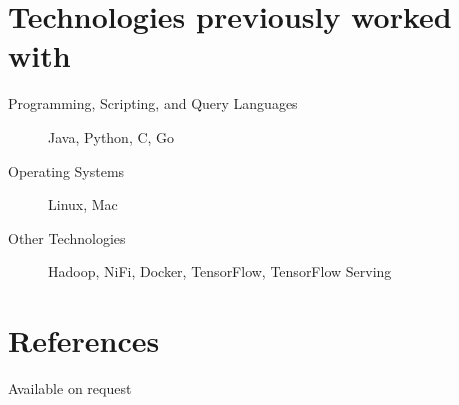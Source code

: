\documentclass[margin,line,a4paper]{resume}
\begin{document}
\begin{resume}
\begin{description}
            \end{description}

        \section{\mysidestyle Technologies previously worked with}
        	\begin{description}
	        	\item [Programming, Scripting, and Query Languages] Java, Python, C, Go
	 			\item [Operating Systems] Linux, Mac
	 			\item [Other Technologies] Hadoop, NiFi, Docker, TensorFlow, TensorFlow Serving
	 		\end{description}

       	\section{\mysidestyle References}
            Available on request
    \end{resume}
\end{document}
